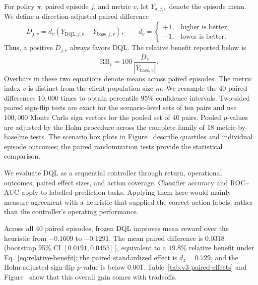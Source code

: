 For policy $\pi$, paired episode $j$, and metric $v$, let
$Y_{\pi,j,v}$ denote the episode mean.  We define a direction-adjusted paired
difference
\begin{equation}
  D_{j,v}=d_v\left(Y_{\mathrm{DQL},j,v}
  -Y_{\mathrm{base},j,v}\right),
  \qquad
  d_v=\begin{cases}
  +1,&\text{higher is better},\\
  -1,&\text{lower is better}.
  \end{cases}
  \label{eq:direction-adjusted-effect}
\end{equation}
Thus, a positive $D_{j,v}$ always favors DQL.  The relative benefit reported
below is
\begin{equation}
  \mathrm{RB}_v=100\,
  \frac{\overline{D}_v}{\left|\overline{Y}_{\mathrm{base},v}\right|}.
  \label{eq:relative-benefit}
\end{equation}
Overbars in these two equations denote means across paired episodes.
The metric index $v$ is distinct from the client-population size $m$.
We resample the 40 paired differences $10{,}000$ times to obtain percentile
$95\%$ confidence intervals.  Two-sided paired sign-flip tests are exact for
the scenario-level sets of ten pairs and use $100{,}000$ Monte Carlo sign
vectors for the pooled set of 40 pairs.  Pooled $p$-values are adjusted by the
Holm procedure across the complete family of 18 metric-by-baseline tests.  The
scenario box plots in Figure~ describe quartiles
and individual episode outcomes; the paired randomization tests
provide the statistical comparison.

We evaluate DQL as a sequential controller through return, operational
outcomes, paired effect sizes, and action coverage. Classifier accuracy and
ROC--AUC apply to labelled prediction tasks. Applying them here would mainly
measure agreement with a heuristic that supplied the correct-action labels,
rather than the controller's operating performance.

Across all 40 paired episodes, frozen DQL improves mean reward over the
heuristic from $-0.1609$ to $-0.1291$.  The mean paired difference is $0.0318$
(bootstrap 95\% CI $[0.0191,0.0455]$), equivalent to a $19.8\%$ relative
benefit under Eq.~\eqref{eq:relative-benefit}; the paired standardized effect is
$d_z=0.729$, and the Holm-adjusted sign-flip $p$-value is below $0.001$.
Table~\ref{tab:v3-paired-effects} and Figure~ show
that this overall gain comes with tradeoffs.

